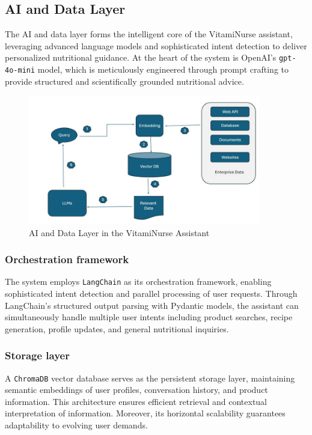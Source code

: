 \subsection{AI and Data Layer}
The AI and data layer forms the intelligent core of the VitamiNurse assistant, leveraging advanced language models and sophisticated intent detection to deliver personalized nutritional guidance. At the heart of the system is OpenAI's \texttt{gpt-4o-mini} model, which is meticulously engineered through prompt crafting to provide structured and scientifically grounded nutritional advice.
 \begin{center}
    \begin{figure}[H]
    \includegraphics[width=0.9\textwidth]{images/chatbot_ai_data_layer.png}
    \caption{AI and Data Layer in the VitamiNurse Assistant} 
    \label{fig:chatbot_ai_data_layer}
\end{figure}
\end{center}

\subsubsection{Orchestration framework}
The system employs \texttt{LangChain} as its orchestration framework, enabling sophisticated intent detection and parallel processing of user requests. Through LangChain's structured output parsing with Pydantic models, the assistant can simultaneously handle multiple user intents including product searches, recipe generation, profile updates, and general nutritional inquiries.
\subsubsection{Storage layer}
A \texttt{ChromaDB} vector database serves as the persistent storage layer, maintaining semantic embeddings of user profiles, conversation history, and product information. This architecture ensures efficient retrieval and contextual interpretation of information. Moreover, its horizontal scalability guarantees adaptability to evolving user demands.
